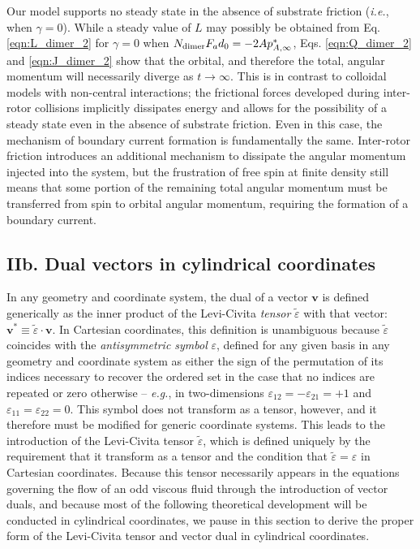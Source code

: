 \documentclass[%
 reprint,
superscriptaddress,
longbibliography,
 amsmath,amssymb,
 prl,
 citeautoscript,
]{revtex4-1}
\begin{document}
Our model supports no steady state in the absence of substrate friction ({\it i.e.}, when $\gamma = 0$). While a steady value of $L$ may possibly be obtained from Eq. \ref{eqn:L_dimer_2} for $\gamma = 0$ when $N_{\rm dimer} F_a d_0 = - 2 A p^*_{A,\infty}$, Eqs. \ref{eqn:Q_dimer_2} and \ref{eqn:J_dimer_2} show that the orbital, and therefore the total, angular momentum will necessarily diverge as $t \rightarrow \infty$. This is in contrast to colloidal models with non-central interactions; the frictional forces developed during inter-rotor collisions implicitly dissipates energy and allows for the possibility of a steady state even in the absence of substrate friction. Even in this case, the mechanism of boundary current formation is fundamentally the same. Inter-rotor friction introduces an additional mechanism to dissipate the angular momentum injected into the system, but the frustration of free spin at finite density still means that some portion of the remaining total angular momentum must be transferred from spin to orbital angular momentum, requiring the formation of a boundary current.

\subsection{IIb. Dual vectors in cylindrical coordinates}

In any geometry and coordinate system, the dual of a vector ${\boldsymbol v}$ is defined generically as the inner product of the Levi-Civita {\it tensor} $\tilde{\varepsilon}$ with that vector: ${\boldsymbol v}^* \equiv \tilde{\varepsilon} \cdot {\boldsymbol v}$. In Cartesian coordinates, this definition is unambiguous because $\tilde{\varepsilon}$ coincides with the {\it antisymmetric symbol} $\varepsilon$, defined for any given basis in any geometry and coordinate system as either the sign of the permutation of its indices necessary to recover the ordered set in the case that no indices are repeated or zero otherwise -- {\it e.g.}, in two-dimensions $\varepsilon_{12} = - \varepsilon_{21} = +1$ and $\varepsilon_{11} = \varepsilon_{22} = 0$. This symbol does not transform as a tensor, however, and it therefore must be modified for generic coordinate systems. This leads to the introduction of the Levi-Civita tensor $\tilde{\varepsilon}$, which is defined uniquely by the requirement that it transform as a tensor and the condition that $\tilde{\varepsilon} = \varepsilon$ in Cartesian coordinates. Because this tensor necessarily appears in the equations governing the flow of an odd viscous fluid through the introduction of vector duals, and because most of the following theoretical development will be conducted in cylindrical coordinates, we pause in this section to derive the proper form of the Levi-Civita tensor and vector dual in cylindrical coordinates.
\end{document}
